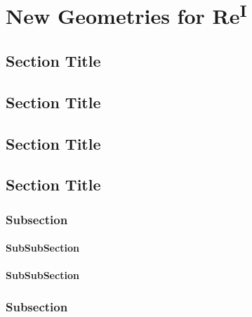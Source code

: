 \chapter{New Geometries for \texorpdfstring{Re\textsuperscript{I}}{Rhenium (I)}}
\section{Section Title}


\section{Section Title}

\section{Section Title}

\section{Section Title}
\subsection{Subsection}

\subsubsection{SubSubSection}

\subsubsection{SubSubSection}

\subsection{Subsection}

